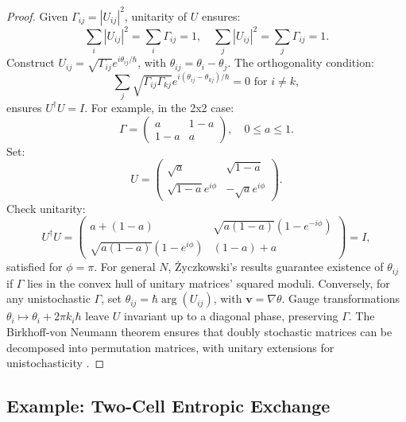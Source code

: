 \documentclass[12pt]{article}
\begin{document}
\begin{proof}
Given \(\Gamma_{ij} = |U_{ij}|^2\), unitarity of \(U\) ensures:
\[
\sum_i |U_{ij}|^2 = \sum_i \Gamma_{ij} = 1, \quad \sum_j |U_{ij}|^2 = \sum_j \Gamma_{ij} = 1.
\]
Construct \(U_{ij} = \sqrt{\Gamma_{ij}} e^{i \theta_{ij} / \hbar}\), with \(\theta_{ij} = \theta_i - \theta_j\). The orthogonality condition:
\[
\sum_j \sqrt{\Gamma_{ij} \Gamma_{kj}} e^{i (\theta_{ij} - \theta_{kj}) / \hbar} = 0 \text{ for } i \neq k,
\]
ensures \(U^\dagger U = I\). For example, in the 2x2 case:
\[
\Gamma = \begin{pmatrix} a & 1-a \\ 1-a & a \end{pmatrix}, \quad 0 \leq a \leq 1.
\]
Set:
\[
U = \begin{pmatrix} \sqrt{a} & \sqrt{1-a} \\ \sqrt{1-a} e^{i \phi} & -\sqrt{a} e^{i \phi} \end{pmatrix}.
\]
Check unitarity:
\[
U^\dagger U = \begin{pmatrix} a + (1-a) & \sqrt{a (1-a)} (1 - e^{-i \phi}) \\ \sqrt{a (1-a)} (1 - e^{i \phi}) & (1-a) + a \end{pmatrix} = I,
\]
satisfied for \(\phi = \pi\). For general \(N\), Życzkowski’s results \cite{Zyczkowski1994} guarantee existence of \(\theta_{ij}\) if \(\Gamma\) lies in the convex hull of unitary matrices’ squared moduli. Conversely, for any unistochastic \(\Gamma\), set \(\theta_{ij} = \hbar \arg(U_{ij})\), with \(\mathbf{v} = \nabla \theta\). Gauge transformations \(\theta_i \mapsto \theta_i + 2\pi k_i \hbar\) leave \(U\) invariant up to a diagonal phase, preserving \(\Gamma\). The Birkhoff-von Neumann theorem ensures that doubly stochastic matrices can be decomposed into permutation matrices, with unitary extensions for unistochasticity \cite{Zyczkowski2003}.
\end{proof}

\subsection{Example: Two-Cell Entropic Exchange}
\end{document}
